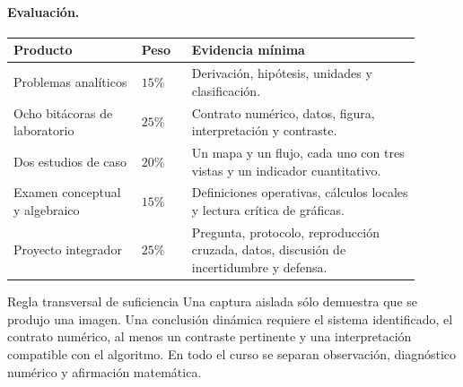 \paragraph{Evaluación.}
\begin{longtable}{>{\raggedright\arraybackslash}p{0.29\linewidth}
                  >{\centering\arraybackslash}p{0.11\linewidth}
                  >{\raggedright\arraybackslash}p{0.50\linewidth}}
\toprule
Producto & Peso & Evidencia mínima \\
\midrule
\endhead
Problemas analíticos & \(15\%\) & Derivación, hipótesis, unidades y clasificación.\\
Ocho bitácoras de laboratorio & \(25\%\) & Contrato numérico, datos, figura,
interpretación y contraste.\\
Dos estudios de caso & \(20\%\) & Un mapa y un flujo, cada uno con tres vistas y un
indicador cuantitativo.\\
Examen conceptual y algebraico & \(15\%\) & Definiciones operativas, cálculos locales
y lectura crítica de gráficas.\\
Proyecto integrador & \(25\%\) & Pregunta, protocolo, reproducción cruzada, datos,
discusión de incertidumbre y defensa.\\
\bottomrule
\end{longtable}

\begin{evidencebox}{Regla transversal de suficiencia}
Una captura aislada sólo demuestra que se produjo una imagen. Una conclusión dinámica
requiere el sistema identificado, el contrato numérico, al menos un contraste
pertinente y una interpretación compatible con el algoritmo. En todo el curso se
separan observación, diagnóstico numérico y afirmación matemática.
\end{evidencebox}

